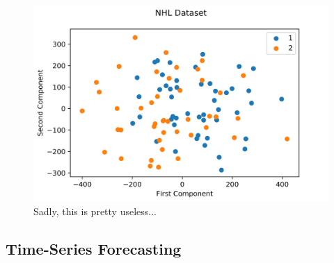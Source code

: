 \documentclass{notes}
\begin{document}
        \begin{figure}
          \centering
          \includegraphics[width=0.8\linewidth]{figures/pca1.png}
          \caption{Sadly, this is pretty useless...}
          \label{fig:pca}
        \end{figure}






    \subsection{Time-Series Forecasting}
\end{document}
